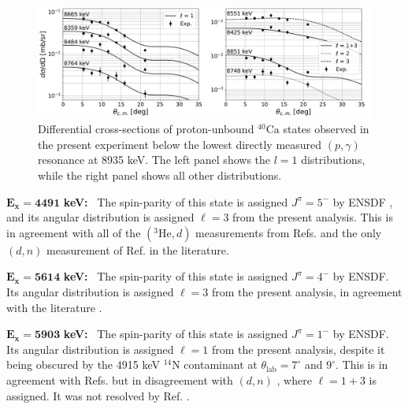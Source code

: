 \newpage

\begin{figure}[t]
\centering
\includegraphics[width=6.5in]{Chapter-6/figs/unbound.png}
\caption{\label{fig:unbound_l}Differential cross-sections of proton-unbound $^{40}\mathrm{Ca}$ states observed in the present experiment below the lowest directly measured $(p,\gamma)$ resonance at 8935 keV. The left panel shows the $l=1$ distributions, while the right panel shows all other distributions.}
\end{figure}

\emph{$\mathbf{E_{x} = 4491}$} \textbf{keV:} \, 
The spin-parity of this state is assigned $J^{\pi} = 5^{-}$ by ENSDF \cite{Chen2017}, and its angular distribution is assigned $\ell=3$ from the present analysis. This is in agreement with all of the $(^{3}\mathrm{He}, d)$ measurements from Refs. \cite{Erskine1966,Seth1967,Forster1970,Cage1971} and the only $(d, n)$ measurement of Ref. \cite{Fuchs1969} in the literature.

\emph{$\mathbf{E_{x} = 5614}$} \textbf{keV:} \, 
The spin-parity of this state is assigned $J^{\pi} = 4^{-}$ by ENSDF. Its angular distribution is assigned $\ell=3$ from the present analysis, in agreement with the literature \cite{Erskine1966,Seth1967,Forster1970,Cage1971,Fuchs1969}.

\emph{$\mathbf{E_{x} = 5903}$} \textbf{keV:} \, 
The spin-parity of this state is assigned $J^{\pi} = 1^{-}$ by ENSDF. Its angular distribution is assigned $\ell=1$ from the present analysis, despite it being obscured by the 4915 keV $^{14}$N contaminant at $\theta_{\mathrm{lab}} = 7^{\circ}$ and $9^{\circ}$. This is in agreement with Refs. \cite{Erskine1966,Seth1967,Cage1971} but in disagreement with $(d,n)$ \cite{Fuchs1969}, where $\ell = 1+3$ is assigned. It was not resolved by Ref. \cite{Forster1970}.

